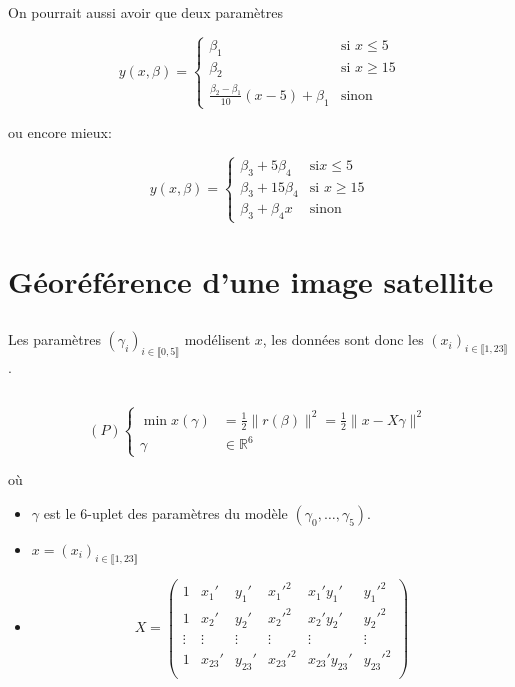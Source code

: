\documentclass{article}
\newcommand{\cor}[1]{{\color{DarkGreen} #1}}
\begin{document}
\cor{On pourrait aussi avoir que deux paramètres

	\[
		y(x, \beta) = \begin{cases}
			\beta_1 &\text{si } x \le 5 \\
			\beta_2 &\text{si } x \ge 15 \\
			\frac{\beta_2 - \beta_1}{10}(x-5) + \beta_1 &\text{sinon}
		\end{cases}
	\] 

	ou encore mieux:
	
	\[
		y(x, \beta) = \begin{cases}
			\beta_3 + 5\beta_4 &\text{si} x\le 5 \\
			\beta_3 + 15\beta_4 &\text{si } x\ge 15 \\
			\beta_3 + \beta_4x &\text{sinon}
		\end{cases}
	\] 
}

\section{Géoréférence d'une image satellite}

\subsection{}

Les paramètres $(\gamma_i)_{i\in \llbracket 0, 5 \rrbracket}$ modélisent $x$, les données sont donc les $(x_i)_{i\in \llbracket 1, 23 \rrbracket}$.

\subsection{}

\[
	(P) \begin{cases}
		\min x(\gamma) &= \frac{1}{2} \|r(\beta)\|^2 = \frac{1}{2} \|x-X\gamma\|^2 \\
		\gamma &\in \mathbb{R}^6
	\end{cases}
\] 

où

\begin{itemize}
	\item $\gamma$ est le 6-uplet des paramètres du modèle $(\gamma_0, \ldots, \gamma_5)$.
	\item $x = (x_i)_{i\in \llbracket 1, 23 \rrbracket}$
	\item \[
			X = \begin{pmatrix}
				1 & x_1' & y_1' & x_1'^2 & x_1' y_1' & y_1'^2 \\
				1 & x_2' & y_2' & x_2'^2 & x_2' y_2' & y_2'^2 \\
				\vdots & \vdots & \vdots & \vdots & \vdots & \vdots \\
				1 & x_{23}' & y_{23}' & x_{23}'^2 & x_{23}' y_{23}' & y_{23}'^2 \\
			\end{pmatrix} 
	\] 
\end{itemize}
\end{document}

